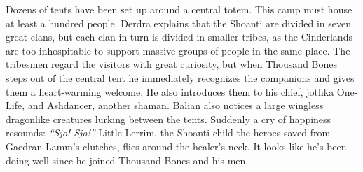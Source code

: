 Dozens of tents have been set up around a central totem. This camp must house at least a hundred people. Derdra explains that the Shoanti are divided in seven great clans, but each clan in turn is divided in smaller tribes, as the Cinderlands are too inhospitable to support massive groups of people in the same place. The tribesmen regard the visitors with great curiosity, but when Thousand Bones steps out of the central tent he immediately recognizes the companions and gives them a heart-warming welcome. He also introduces them to his chief, jothka One-Life, and Ashdancer, another shaman. Balian also notices a large wingless dragonlike creatures lurking between the tents. Suddenly a cry of happiness resounds: {\itshape``Sjo! Sjo!''} Little Lerrim, the Shoanti child the heroes saved from Gaedran Lamm's clutches, flies around the healer's neck. It looks like he's been doing well since he joined Thousand Bones and his men.\\

